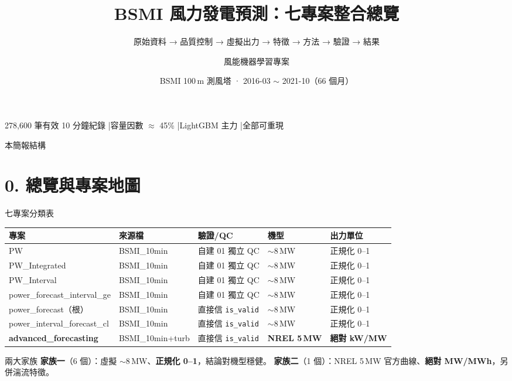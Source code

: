 \documentclass[aspectratio=169,11pt]{beamer}
\title{\textbf{BSMI 風力發電預測：七專案整合總覽}}
\subtitle{原始資料 → 品質控制 → 虛擬出力 → 特徵 → 方法 → 驗證 → 結果}
\author{風能機器學習專案}
\date{BSMI 100\,m 測風塔 · 2016-03 $\sim$ 2021-10（66 個月）}
\begin{document}
\begin{frame}[plain]
  \titlepage
  \begin{center}\footnotesize
  278{,}600 筆有效 10 分鐘紀錄 \quad|\quad 容量因數 $\approx$ 45\% \quad|\quad LightGBM 主力 \quad|\quad 全部可重現
  \end{center}
\end{frame}

\begin{frame}{本簡報結構}
  \tableofcontents
\end{frame}

\section{0. 總覽與專案地圖}
\begin{frame}{七專案分類表}
  \scriptsize
  \begin{tabular}{lllll}
    \toprule
    \textbf{專案} & \textbf{來源檔} & \textbf{驗證/QC} & \textbf{機型} & \textbf{出力單位}\\
    \midrule
    PW & BSMI\_10min & 自建 01 獨立 QC & $\sim$8\,MW & 正規化 0–1\\
    PW\_Integrated & BSMI\_10min & 自建 01 獨立 QC & $\sim$8\,MW & 正規化 0–1\\
    PW\_Interval & BSMI\_10min & 自建 01 獨立 QC & $\sim$8\,MW & 正規化 0–1\\
    power\_forecast\_interval\_ge & BSMI\_10min & 自建 01 獨立 QC & $\sim$8\,MW & 正規化 0–1\\
    power\_forecast（根） & BSMI\_10min & 直接信 \texttt{is\_valid} & $\sim$8\,MW & 正規化 0–1\\
    power\_interval\_forecast\_cl & BSMI\_10min & 直接信 \texttt{is\_valid} & $\sim$8\,MW & 正規化 0–1\\
    \textcolor{fam2}{\textbf{advanced\_forecasting}} & \textcolor{fam2}{BSMI\_10min+turb} & 直接信 \texttt{is\_valid} & \textcolor{fam2}{\textbf{NREL 5\,MW}} & \textcolor{fam2}{\textbf{絕對 kW/MW}}\\
    \bottomrule
  \end{tabular}
  \vspace{4pt}
  \begin{block}{兩大家族}
  \footnotesize
  \textbf{家族一}（6 個）：虛擬 $\sim$8\,MW、\textbf{正規化 0–1}，結論對機型穩健。\quad
  \textbf{家族二}（1 個）：NREL 5\,MW 官方曲線、\textbf{絕對 MW/MWh}，另併湍流特徵。
  \end{block}
\end{frame}
\end{document}
